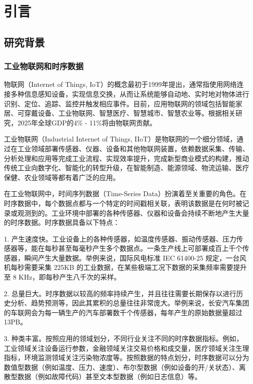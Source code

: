 
\chapter{引言}


\section{研究背景}\label{1-background}

\subsection{工业物联网和时序数据}
物联网（Internet of Things, IoT）的概念最初于1999年提出，通常指使用网络连接多种信息感知设备，实现信息交换，从而让系统能够自动地、实时地对物体进行识别、定位、追踪、监控并触发相应事件\cite{王保云2009物联网技术研究综述木}。目前，应用物联网的领域包括智能家居、可穿戴设备、工业物联网、智慧医疗、智慧城市、智慧农业等。根据相关研究，2025年全球GDP的4\% - 11\%将由物联网贡献\cite{mouha2021internet}。

工业物联网（Industrial Internet of Things, IIoT）\cite{sisinni2018industrial}是物联网的一个细分领域，通过在工业领域部署传感器、仪器、设备和其他物联网装置，依赖数据采集、传输、分析处理和应用等完成工业流程、实现效率提升，完成新型商业模式的构建，推动传统工业向数字化、智能化的转型升级，在智能制造、能源领域、物流运输、医疗保健、农业领域等都有着广泛的应用。

在工业物联网中，时间序列数据（Time-Series Data）\cite{dunning2015tsdb}扮演着至关重要的角色。在时序数据中，每个数据点都与一个特定的时间戳相关联，表明该数据是在何时被记录或观测到的。工业环境中部署的各种传感器、仪器和设备会持续不断地产生大量的时序数据。时序数据具备以下特点：

1. 产生速度快。工业设备上的各种传感器，如温度传感器、振动传感器、压力传感器等，能在每秒甚至每毫秒产生多个数据点。一条生产线上可部署成百上千个传感器，瞬间产生大量数据。举例来说，国际风电标准 IEC 61400-25 规定，一台风机每秒需要采集 225KB 的工业数据，在某些极端工况下数据的采集频率需要提升至 8 KHz\cite{PZKX202005001}，即每秒产生八千次的采样。

2. 总量巨大。时序数据以较高的频率持续产生，并且往往需要长期保存以进行历史分析、趋势预测等，因此其累积的总量往往非常庞大。举例来说，长安汽车集团的车联网会为每一辆生产的汽车部署数千个传感器，每年产生的原始数据量超过13PB。

3. 种类丰富。按照应用的领域划分，不同行业关注不同的时序数据指标。例如，工业领域关注设备运行参数，金融领域关注交易价格和成交量，医疗领域关注生理指标，环境监测领域关注污染物浓度等。按照数据的特点划分，时序数据可以分为数值型数据（例如温度、压力、速度）、布尔型数据（例如设备的开/关状态）、离散型数据（例如故障代码）甚至文本型数据（例如日志信息）等。


